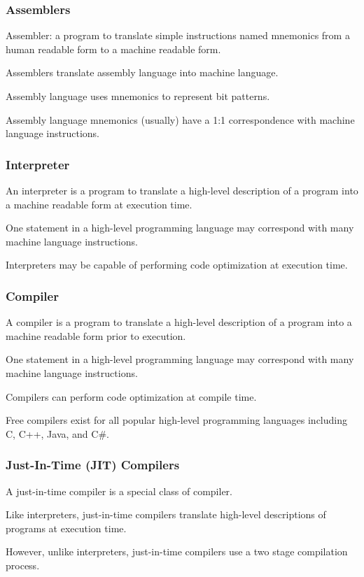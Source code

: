 \begin{frame}
\frametitle{Assemblers}

\alert{Assembler}: a program to translate simple instructions named mnemonics from a human readable form to a machine readable form.

Assemblers translate assembly language into machine language.

Assembly language uses mnemonics to represent bit patterns.

Assembly language mnemonics (usually) have a 1:1 correspondence with machine language instructions.

\end{frame}

\begin{frame}
\frametitle{Interpreter}

An \alert{interpreter} is a program to translate a high-level description of a program into a machine readable form at execution time.

One statement in a high-level programming language may correspond with many machine language instructions.

Interpreters may be capable of performing code optimization at execution time.

\end{frame}

\begin{frame}
\frametitle{Compiler}

A \alert{compiler} is a program to translate a high-level description of a program into a machine readable form prior to execution.

One statement in a high-level programming language may correspond with many machine language instructions.

Compilers can perform code optimization at compile time.

Free compilers exist for all popular high-level programming languages including C, C++, Java, and C\#.

\end{frame}

\begin{frame}
\frametitle{Just-In-Time (JIT) Compilers}

A \alert{just-in-time compiler} is a special class of compiler.

Like interpreters, just-in-time compilers translate high-level descriptions of programs at execution time.

However, unlike interpreters, just-in-time compilers use a two stage compilation process.

\end{frame}

